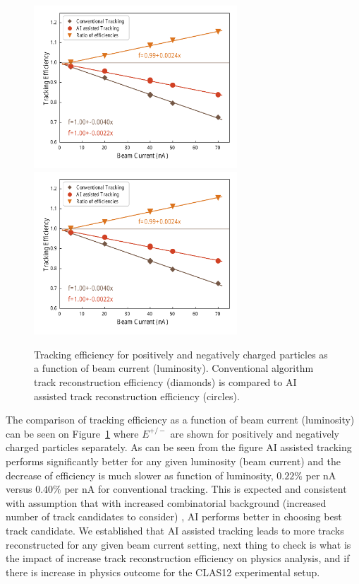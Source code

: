  \begin{figure}[!ht]
\begin{center}
 \includegraphics[width=3.0in]{images/lumi_scan_positive.pdf}
 \includegraphics[width=3.0in]{images/lumi_scan_negative.pdf}
\caption {Tracking efficiency for positively and negatively charged particles as a function of beam current (luminosity).  Conventional algorithm 
track reconstruction efficiency (diamonds) is compared to AI assisted track reconstruction efficiency (circles). }
 \label{lumi:scan}
 \end{center}
\end{figure}

The comparison of tracking efficiency as a function of beam current (luminosity) can be seen on Figure~\ref{lumi:scan} where $E^{+/-}$ are shown for positively and negatively charged particles separately. As can be seen from the figure AI assisted tracking performs significantly better for any given luminosity (beam current) and the decrease of efficiency is much slower as function of luminosity, $0.22\%$ per nA versus $0.40\%$ per nA for conventional tracking. This is expected and consistent with assumption that with increased combinatorial background (increased number of track candidates to consider) , AI performs better in choosing best track candidate. We established that AI assisted
tracking leads to more tracks reconstructed for any given beam current setting, next thing to check is what is the impact of increase track reconstruction
efficiency on physics analysis, and if there is increase in physics outcome for the CLAS12 experimental setup.

